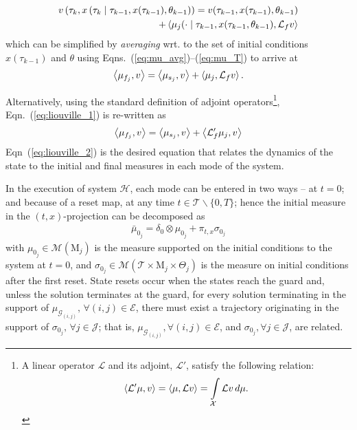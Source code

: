 \small
\begin{align}
\begin{split}
    v\left(\tau_k,x\left(\tau_{k}\mid \tau_{k-1},x(\tau_{k-1}),\theta_{k-1}\right)\right)=v(\tau_{k-1},x(\tau_{k-1}),\theta_{k-1})\\
    +\left\langle \mu_j(\cdot\mid \tau_{k-1},x(\tau_{k-1},\theta_{k-1}),\mathcal L_{ f}v\right\rangle
\end{split}
\end{align}
\normalsize
which can be simplified by \emph{averaging} wrt. to the set of initial conditions $x(\tau_{k-1})$ and $\theta$ using Eqns.~(\ref{eq:mu_avg})--(\ref{eq:mu_T}) to arrive at
\begin{align}
  \left\langle \mu_{f_j},v\right\rangle=\left\langle \mu_{s_j},v\right\rangle+\left\langle \mu_{j},\mathcal L_{f}v\right\rangle.
  \label{eq:liouville_1}
\end{align}
\par
Alternatively, using the standard definition of adjoint operators\footnote{A linear operator $\mathcal L$ and its adjoint, $\mathcal L'$, satisfy the following relation:
\begin{align*}
    \left\langle \mathcal L'\mu,v\right\rangle=\left\langle \mu,\mathcal Lv\right\rangle=\int\limits_{\mathcal X}\mathcal Lv\,d\mu.
\end{align*}}, Eqn.~(\ref{eq:liouville_1}) is re-written as
\begin{align}
\left\langle \mu_{f_j},v\right\rangle=\left\langle \mu_{s_j},v\right\rangle+\left\langle \mathcal L'_{f}\mu_{j},v\right\rangle
  \label{eq:liouville_2}
\end{align}
Eqn~(\ref{eq:liouville_2}) is the desired equation that relates the dynamics of the state to the initial and final measures in each mode of the system.
\par
In the execution of system $\mathcal H$, each mode can be entered in two ways -- at $t=0$; and because of a reset map, at any time $t\in \mathcal T\backslash\{0,T\}$; hence the initial measure in the $(t,x)$-projection can be decomposed as
\begin{align}
  \bar\mu_{0_j}=\delta_0\otimes\mu_{0_j}+\pi_{t,x}\sigma_{0_j}
\end{align}
with $\mu_{0_j}\in \mathcal M(\mathrm M_j)$ is the measure supported on the initial conditions to the system at $t=0$, and $\sigma_{0_j}\in \mathcal M(\mathcal T\times \mathrm M_j\times \Theta_j)$ is the measure on initial conditions after the first reset. State resets occur when the states reach the guard and, unless the solution terminates at the guard, for every solution terminating in the support of $\mu_{\mathcal G_{(i,j)}},\,\forall (i,j)\in \mathcal E$, there must exist a trajectory originating in the support of $\sigma_{0_j},\,\forall j\in \mathcal J$; that is, $\mu_{\mathcal G_{(i,j)}},\forall (i,j)\in \mathcal E$, and $\sigma_{0_j},\forall j\in \mathcal J$, are related.
